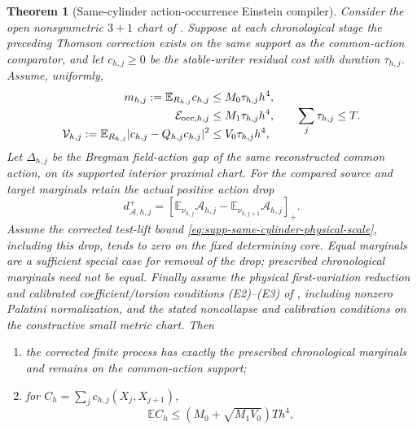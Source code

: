 \documentclass[11pt]{article}
\newtheorem{theorem}{Theorem}[section]
\numberwithin{equation}{section}
\theoremstyle{definition}
\theoremstyle{remark}
\begin{document}
\begin{theorem}[Same-cylinder action-occurrence Einstein compiler]
\label{thm:main-same-cylinder-einstein}
Consider the open nonsymmetric $3+1$ chart of
.  Suppose at each
chronological stage the preceding Thomson correction exists on the same
support as the common-action comparator, and let $c_{h,j}\ge0$ be the
stable-writer residual cost with duration $\tau_{h,j}$.  Assume, uniformly,
\begin{equation}
 \begin{split}
 m_{h,j}:=\mathbb E_{R_{h,j}}c_{h,j}&\le M_0\tau_{h,j}h^4,\\
 \mathcal E_{{\rm occ},h,j}&\le M_1\tau_{h,j}h^4,\\
 \mathcal V_{h,j}:=\mathbb E_{R_{h,j}}
 |c_{h,j}-Q_{h,j}c_{h,j}|^2&\le V_0\tau_{h,j}h^4,
 \end{split}
 \qquad \sum_j\tau_{h,j}\le T.
 \label{eq:main-same-cylinder-writer-scale}
\end{equation}
Let $\Delta_{h,j}$ be the Bregman field-action gap of the same reconstructed
common action, on its supported interior proximal chart.  For the compared
source and target marginals retain the actual positive action drop
\begin{equation}
 d^+_{\mathcal A,h,j}=
 \left[\mathbb E_{\nu_{h,j}}\mathcal A_{h,j}
             -\mathbb E_{\nu_{h,j+1}}\mathcal A_{h,j}\right]_+.
 \label{eq:main-chronological-action-drop}
\end{equation}
Assume the corrected test-lift bound
\eqref{eq:supp-same-cylinder-physical-scale}, including this drop, tends
to zero on the fixed determining core.  Equal marginals are a sufficient
special case for removal of the drop; prescribed chronological marginals
need not be equal.  Finally assume the physical first-variation reduction
and calibrated coefficient/torsion conditions \textup{(E2)--(E3)} of
, including nonzero Palatini normalization,
and the stated noncollapse and calibration conditions on the constructive
small metric chart.  Then
\begin{enumerate}[label=\textup{(\roman*)},leftmargin=2.8em]
\item the corrected finite process has exactly the prescribed chronological
      marginals and remains on the common-action support;
\item for $C_h=\sum_jc_{h,j}(X_j,X_{j+1})$,
      \begin{equation}
       \mathbb EC_h\le
       (M_0+\sqrt{M_1V_0})Th^4,

\end{equation}
\end{enumerate}
\end{theorem}
\end{document}
